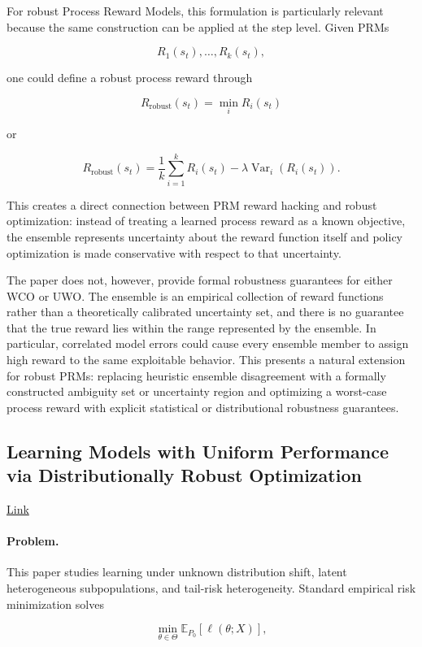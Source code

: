 \documentclass[11pt]{article}
\begin{document}
For robust Process Reward Models, this formulation is particularly relevant because the same construction can be applied at the step level. Given PRMs

\[
R_1(s_t),
\ldots,
R_k(s_t),
\]

one could define a robust process reward through

\[
R_{\mathrm{robust}}(s_t)
=
\min_i R_i(s_t)
\]

or

\[
R_{\mathrm{robust}}(s_t)
=
\frac{1}{k}
\sum_{i=1}^{k}R_i(s_t)
-
\lambda
\operatorname{Var}_{i}
\left(
R_i(s_t)
\right).
\]

This creates a direct connection between PRM reward hacking and robust optimization: instead of treating a learned process reward as a known objective, the ensemble represents uncertainty about the reward function itself and policy optimization is made conservative with respect to that uncertainty.

The paper does not, however, provide formal robustness guarantees for either WCO or UWO. The ensemble is an empirical collection of reward functions rather than a theoretically calibrated uncertainty set, and there is no guarantee that the true reward lies within the range represented by the ensemble. In particular, correlated model errors could cause every ensemble member to assign high reward to the same exploitable behavior. This presents a natural extension for robust PRMs: replacing heuristic ensemble disagreement with a formally constructed ambiguity set or uncertainty region and optimizing a worst-case process reward with explicit statistical or distributional robustness guarantees.

\subsection{Learning Models with Uniform Performance via Distributionally Robust Optimization}

\href{https://arxiv.org/pdf/1810.08750}{Link}

\paragraph{Problem.}

This paper studies learning under unknown distribution shift, latent heterogeneous subpopulations, and tail-risk heterogeneity. Standard empirical risk minimization solves

\[
\min_{\theta \in \Theta}
\mathbb{E}_{P_0}
\left[
\ell(\theta;X)
\right],
\]
\end{document}
